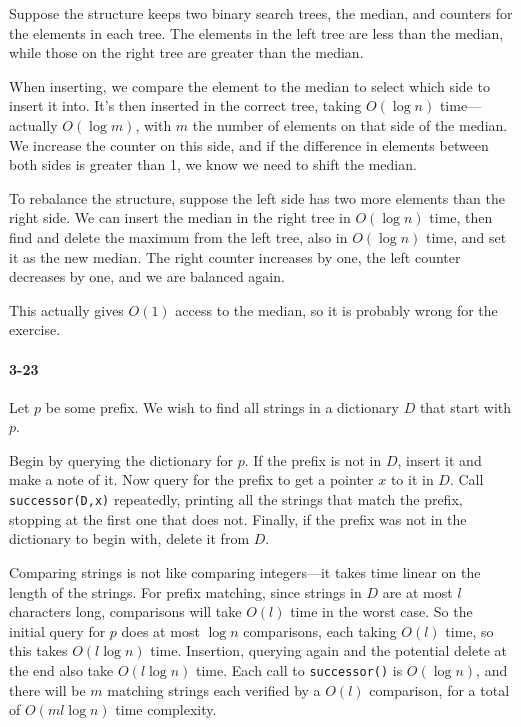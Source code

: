 \documentclass{report}
\begin{document}
Suppose the structure keeps two binary search trees, the median, and counters for the elements in each tree. The elements in the left tree are less than the median, while those on the right tree are greater than the median.

When inserting, we compare the element to the median to select which side to insert it into. It's then inserted in the correct tree, taking $O(\log n)$ time---actually $O(\log m)$, with $m$ the number of elements on that side of the median. We increase the counter on this side, and if the difference in elements between both sides is greater than 1, we know we need to shift the median.

To rebalance the structure, suppose the left side has two more elements than the right side. We can insert the median in the right tree in $O(\log n)$ time, then find and delete the maximum from the left tree, also in $O(\log n)$ time, and set it as the new median. The right counter increases by one, the left counter decreases by one, and we are balanced again.

This actually gives $O(1)$ access to the median, so it is probably wrong for the exercise.

\paragraph{3-23} Let $p$ be some prefix. We wish to find all strings in a dictionary $D$ that start with $p$.

Begin by querying the dictionary for $p$. If the prefix is not in $D$, insert it and make a note of it. Now query for the prefix to get a pointer $x$ to it in $D$. Call \lstinline!successor(D,x)! repeatedly, printing all the strings that match the prefix, stopping at the first one that does not. Finally, if the prefix was not in the dictionary to begin with, delete it from $D$.

Comparing strings is not like comparing integers---it takes time linear on the length of the strings. For prefix matching, since strings in $D$ are at most $l$ characters long, comparisons will take $O(l)$ time in the worst case. So the initial query for $p$ does at most $\log n$ comparisons, each taking $O(l)$ time, so this takes $O(l\log n)$ time. Insertion, querying again and the potential delete at the end also take $O(l\log n)$ time. Each call to \lstinline!successor()! is $O(\log n)$, and there will be $m$ matching strings each verified by a $O(l)$ comparison, for a total of $O(ml\log n)$ time complexity.
\end{document}
